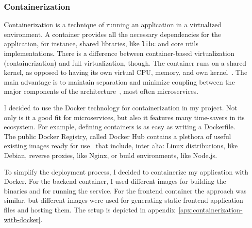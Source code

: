 \subsubsection{Containerization}\label{sec:containerization}

Containerization is a technique of running an application
in a virtualized environment.
A container provides all the necessary dependencies
for the application,
for instance, shared libraries,
like \texttt{libc} and core utils implementations.
There is a difference between container-based virtualization
(containerization) and full virtualization, though.
The container runs on a shared kernel,
as opposed to having its own
virtual CPU, memory, and own kernel~\cite{watada_emerging_2019}.
The main advantage is to maintain separation
and minimize coupling between
the major components of the architecture~\cite{stytz_rapid_1997},
most often microservices.

I decided to use the Docker technology
for containerization in my project.
Not only is it a good fit for microservices,
but also it features many time-savers in its ecosystem.
For example,
defining containers
is as easy as writing a Dockerfile.
The public Docker Registry,
called Docker Hub contains a plethora
of useful existing images ready for use~\cite{jaramillo_leveraging_2016}
that include, inter alia:
Linux distributions, like Debian,
reverse proxies, like Nginx,
or build environments, like Node.js.

To simplify the deployment process,
I decided to containerize my application
with Docker.
For the backend container,
I used different images
for building the binaries
and for running the service.
For the frontend container the approach was similar,
but different images were used
for generating static frontend application files
and hosting them.
The setup is depicted in appendix~\ref{apx:containerization-with-docker}.
